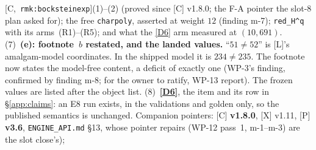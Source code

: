 \documentclass[11pt]{article}
\theoremstyle{remark}
\newcommand{\HA}[1]{[C,~\texttt{#1}]}      %
\begin{document}
\HA{rmk:bocksteinexp}(1)--(2) (proved since [C] v1.8.0; the F-A pointer the slot-8 plan asked
for); the free \texttt{charpoly}, asserted at weight $12$ (finding m-7); \texttt{red\_H\textasciicircum q}
with its arms~(R1)--(R5); and what the \ref{D6} arm measured at $(10,691)$.
(7)~\textbf{(e): footnote~$b$ restated, and the landed values.} ``$51\ne52$'' is [L]'s
amalgam-model coordinates. In the shipped model it is $234\ne235$. The footnote now states the
model-free content, a deficit of exactly one (WP-3's finding, confirmed by finding m-8; for the
owner to ratify, WP-13 report). The frozen values are listed after the object list.
(8)~\textbf{\ref{D6}}, the item and its row in \S\ref{app:claims}: an E8 run exists, in the
validations and golden only, so the published semantics is unchanged.
Companion pointers: [C] \textbf{v1.8.0}, [X] v1.11, [P] \textbf{v3.6},
\texttt{ENGINE\_API.md} \S13, whose pointer repairs (WP-12 pass~1, m-1--m-3) are the slot close's);
\end{document}
